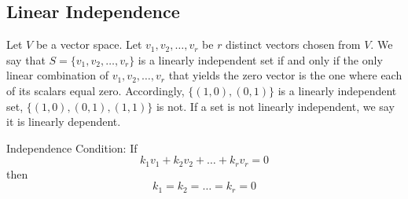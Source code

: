 \documentclass[12pt]{article}
\begin{document}
\subsection{Linear Independence}
\begin{definition} Let $V$ be a vector space. Let $v_1, v_2, \dots, v_r$ be $r$ distinct vectors chosen from $V$. We say that $S = \{v_1, v_2, \dots, v_r\}$ is a linearly independent set if and only if the only linear combination of $v_1, v_2, \dots, v_r$ that yields the zero vector is the one where each of its scalars equal zero. Accordingly, $\{(1, 0), (0, 1)\}$ is a linearly independent set, $\{(1, 0), (0, 1), (1, 1)\}$ is not. If a set is not linearly independent, we say it is linearly dependent. \end{definition}
Independence Condition: If $$k_1v_1 + k_2v_2 + \dots + k_rv_r = 0 $$ then $$ k_1 = k_2 = \dots = k_r = 0 $$ 
\end{document}
